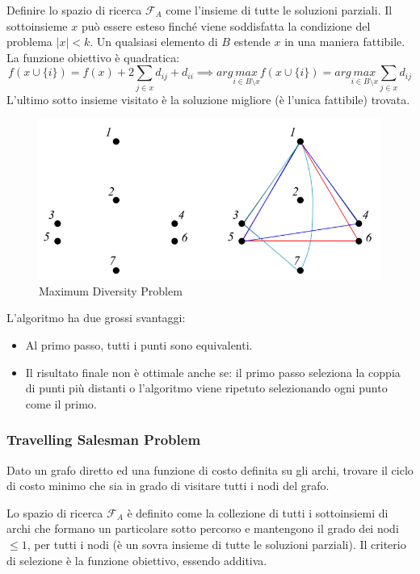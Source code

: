 \documentclass{article}
\begin{document}
Definire lo spazio di ricerca $\mathcal{F}_A$ come l'insieme di tutte le soluzioni parziali. Il
sottoinsieme $x$ può essere esteso finché viene soddisfatta la condizione del problema $|x|<k$.
Un qualsiasi elemento di $B$ estende $x$ in una maniera fattibile. La funzione obiettivo è quadratica:
$$f(x\cup\{i\})=f(x)+2\sum_{j\in x}d_{ij}+d_{ii}\implies arg\underset{i\in B\setminus x}{max}f(x\cup \{i\})=arg\underset{i\in B\setminus x}{max}\sum_{j\in x} d_{ij}$$
L'ultimo sotto insieme visitato è la soluzione migliore (è l'unica fattibile) trovata.

\begin{figure}[H]
    \centering
    \includegraphics[scale=0.5]{images/MDP_construct.png}
    \caption{Maximum Diversity Problem}
\end{figure}

L'algoritmo ha due grossi svantaggi:
\begin{itemize}
    \item Al primo passo, tutti i punti sono equivalenti.
    \item Il risultato finale non è ottimale anche se: il primo passo seleziona la coppia di
          punti più distanti o l'algoritmo viene ripetuto selezionando ogni punto come il primo.
\end{itemize}

\subsubsection{Travelling Salesman Problem}
Dato un grafo diretto ed una funzione di costo definita su gli archi, trovare il ciclo di costo
minimo che sia in grado di visitare tutti i nodi del grafo.

Lo spazio di ricerca $\mathcal{F}_A$ è definito come la collezione di tutti i sottoinsiemi di archi che
formano un particolare sotto percorso e mantengono il grado dei nodi $\leq 1$, per tutti i nodi (è
un sovra insieme di tutte le soluzioni parziali).
Il criterio di selezione è la funzione obiettivo, essendo additiva.
\end{document}
